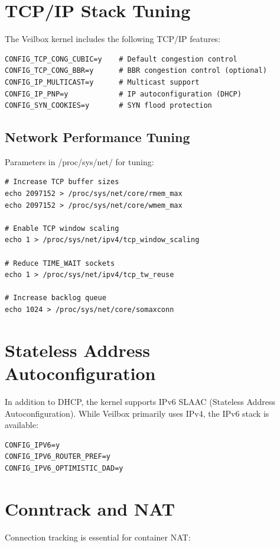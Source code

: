 \section{TCP/IP Stack Tuning}

The Veilbox kernel includes the following TCP/IP features:

\begin{lstlisting}
CONFIG_TCP_CONG_CUBIC=y    # Default congestion control
CONFIG_TCP_CONG_BBR=y      # BBR congestion control (optional)
CONFIG_IP_MULTICAST=y      # Multicast support
CONFIG_IP_PNP=y            # IP autoconfiguration (DHCP)
CONFIG_SYN_COOKIES=y       # SYN flood protection
\end{lstlisting}

\subsection{Network Performance Tuning}

Parameters in /proc/sys/net/ for tuning:

\begin{lstlisting}
# Increase TCP buffer sizes
echo 2097152 > /proc/sys/net/core/rmem_max
echo 2097152 > /proc/sys/net/core/wmem_max

# Enable TCP window scaling
echo 1 > /proc/sys/net/ipv4/tcp_window_scaling

# Reduce TIME_WAIT sockets
echo 1 > /proc/sys/net/ipv4/tcp_tw_reuse

# Increase backlog queue
echo 1024 > /proc/sys/net/core/somaxconn
\end{lstlisting}

\section{Stateless Address Autoconfiguration}

In addition to DHCP, the kernel supports IPv6 SLAAC (Stateless Address
Autoconfiguration). While Veilbox primarily uses IPv4, the IPv6 stack
is available:

\begin{lstlisting}
CONFIG_IPV6=y
CONFIG_IPV6_ROUTER_PREF=y
CONFIG_IPV6_OPTIMISTIC_DAD=y
\end{lstlisting}

\section{Conntrack and NAT}

Connection tracking is essential for container NAT:

